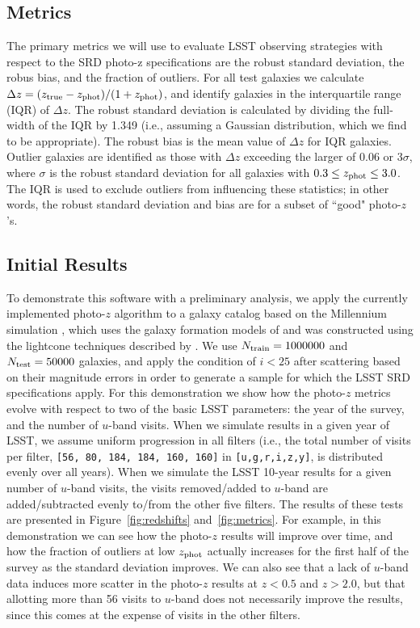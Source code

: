 \subsection{Metrics}

The primary metrics we will use to evaluate LSST
observing strategies with respect to the SRD photo-z specifications are the
robust standard deviation, the robus bias, and the fraction of outliers. For all test
galaxies we calculate $\Delta z = (z_{\rm true} - z_{\rm phot}) /
(1+z_{\rm phot})$, and identify galaxies in the interquartile range (IQR) of $\Delta z$.
The robust standard deviation is calculated by dividing the full-width of the IQR by 1.349 (i.e., assuming a Gaussian distribution, which we find to be appropriate).
The robust bias is the mean value of $\Delta z$ for IQR galaxies.
Outlier galaxies are identified as those with $\Delta z$ exceeding the larger of 0.06 or 3$\sigma$, 
where $\sigma$ is the robust standard deviation for all galaxies with $0.3 \leq z_{\rm phot} \leq 3.0$.
The IQR is used to exclude outliers from influencing these statistics; in other words, the robust
standard deviation and bias are for a subset of ``good" photo-$z$'s.

\subsection{Initial Results}

To demonstrate this software with a
preliminary analysis, we apply the currently implemented photo-$z$
algorithm to a galaxy catalog based on the Millennium simulation \citep{2005Natur.435..629S},
which uses the galaxy formation models of \citep{2014MNRAS.439..264G}
and was constructed using the lightcone techniques described by \cite{2013MNRAS.429..556M}.
We use $N_{\rm train}=1000000$ and $N_{\rm test}=50000$ galaxies, and apply the 
condition of $i<25$ after scattering based on their magnitude errors in order
to generate a sample for which the LSST SRD specifications apply.
For this demonstration we show how the photo-$z$ metrics evolve with respect to
two of the basic LSST parameters: the year of the survey, and the number
of $u$-band visits. When we simulate results in a given year of LSST, we
assume uniform progression in all filters (i.e., the total number of
visits per filter, \texttt{[56, 80, 184, 184, 160, 160]} in
\texttt{[u,g,r,i,z,y]}, is distributed evenly over all years). When we
simulate the LSST 10-year results for a given number of $u$-band visits,
the visits removed/added to $u$-band are added/subtracted evenly to/from
the other five filters. The results of these tests are presented in
Figure~\ref{fig:redshifts} and~\ref{fig:metrics}. For example, in this
demonstration we can see how the photo-$z$ results will improve
over time, and how the fraction of outliers at low $z_{\rm phot}$ actually increases
for the first half of the survey as the standard deviation improves.
We can also see that a lack of $u$-band data induces more scatter 
in the photo-$z$ results at $z<0.5$ and $z>2.0$, but that allotting 
more than 56 visits to $u$-band does not necessarily improve the results,
since this comes at the expense of visits in the other filters.


